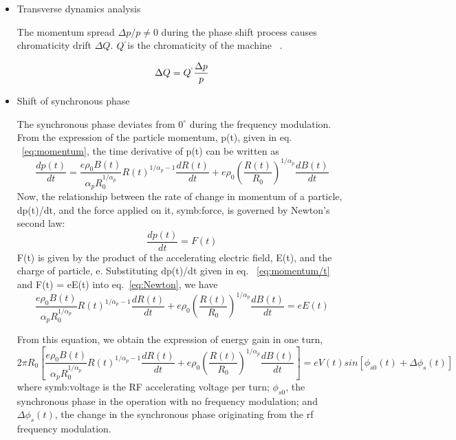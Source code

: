 \begin{itemize}
	\item Transverse dynamics analysis

The momentum spread ${\Delta{p}}/{p} \neq 0$ during the phase shift process causes chromaticity drift $\Delta{Q}$. $Q^`$is the chromaticity of the machine ~\cite{holzer_introduction_2013}.

\begin{equation}
\Delta{Q} = Q^`\frac{\Delta{p}}{p}
\label{eq:chromaticity}
\end{equation} 
	\item Shift of synchronous phase

The synchronous phase deviates from $0^\circ$ during the frequency modulation. From the expression of the particle momentum, p(t), given in eq. ~\ref{eq:momentum}, the time derivative of p(t) can be written as
\begin{equation}
\frac {dp(t)}{dt} = \frac {e\rho_0B(t)}{\alpha_pR_0^{1/\alpha_p}}R(t)^{1/\alpha_p-1}\frac{dR(t)}{dt}+e\rho_0 (\frac {R(t)}{R_0})^{1/\alpha_p }\frac{dB(t)}{dt}
\label{eq:momentum/t}
\end{equation} 
Now, the relationship between the rate of change in momentum of a particle, dp(t)/dt,
and the force applied on it, \gls{symb:force}, is governed by Newton’s second law:
\begin{equation}
\frac {dp(t)}{dt} = F(t)
\label{eq:Newton}
\end{equation} 
F(t) is given by the product of the accelerating electric field, E(t), and the
charge of particle, e. Substituting dp(t)/dt given in eq. ~\ref{eq:momentum/t} and F(t) = eE(t) into eq.~\ref{eq:Newton}, we have
\begin{equation}
 \frac {e\rho_0B(t)}{\alpha_pR_0^{1/\alpha_p}}R(t)^{1/\alpha_p-1}\frac{dR(t)}{dt}+e\rho_0 (\frac {R(t)}{R_0})^{1/\alpha_p }\frac{dB(t)}{dt}=eE(t)
\label{eq:f=eq}
\end{equation} 

From this equation, we obtain the expression of energy gain in one turn,
\begin{equation}
2\pi R_0 [\frac {e\rho_0B(t)}{\alpha_pR_0^{1/\alpha_p}}R(t)^{1/\alpha_p-1}\frac{dR(t)}{dt}+e\rho_0 (\frac {R(t)}{R_0})^{1/\alpha_p }\frac{dB(t)}{dt}]=eV(t)sin[\phi_{s0}(t)+\Delta \phi_s(t)]
\label{eq:energy_cycle}
\end{equation} 
where \gls{symb:voltage} is the RF accelerating voltage per turn; $\phi_{s0}$, the synchronous phase in the
operation with no frequency modulation; and $\Delta\phi_{s}(t)$, the change in the synchronous phase originating from the rf frequency modulation.


\end{itemize}
